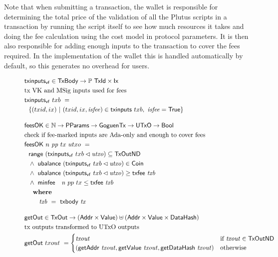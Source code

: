 Note that when submitting a transaction, the wallet is responsible for
determining the total price of the
validation of all the Plutus scripts in a transaction
by running the script itself to see how much resources it takes and doing the
fee calculation using the cost model in protocol parameters. It is then
also responsible for adding enough inputs to the transaction to cover the
fees required. In the implementation of the wallet this is handled
automatically by default, so this generates no overhead for users.

\begin{figure}[htb]
  \begin{align*}
    & \fun{txinputs_{vf}} \in \TxBody \to \powerset{\TxId \times \Ix} \\
    & \text{tx VK and MSig inputs used for fees} \\
    & \fun{txinputs_{vf}} ~txb~= \\
    &~~\{ (txid,ix)~\vert~(txid,ix,\var{isfee}) \in
    \fun{txinputs} ~txb,~
     \var{isfee} = \True\}
    \nextdef
    & \fun{feesOK} \in \N \to \PParams \to \GoguenTx \to \UTxO \to \Bool  \\
    & \text{check if fee-marked inputs are Ada-only and enough to cover fees} \\
    & \fun{feesOK} ~n~\var{pp}~tx~utxo~= \\
    &~~\fun{range}~(\fun{txinputs_{vf}}~{txb} \restrictdom \var{utxo}) \subseteq \TxOutND ~ \\
    &~~\wedge~ \fun{ubalance}~(\fun{txinputs_{vf}}~{txb} \restrictdom \var{utxo}) \in \Coin \\
    &~~      \wedge~ \fun{ubalance}~(\fun{txinputs_{vf}}~{txb} \restrictdom \var{utxo}) \geq \txfee{txb} ~ \\
    &~~      \wedge~ \minfee~n~{pp}~{tx} \leq \txfee{txb} \\
    &~~      \where \\
    & ~~~~~~~ \var{txb}~=~\txbody{tx}
    \nextdef
    & \fun{getOut} \in \TxOut \to (\Addr \times \Value) \uniondistinct (\Addr \times \Value \times \DataHash)  \\
    & \text{tx outputs transformed to UTxO outputs} \\
    & \fun{getOut} ~{txout}~= \begin{cases}
         \var{txout}  & \text{if~} \var{txout} \in \TxOutND \\
              (\fun{getAddr}~\var{txout}, \fun{getValue}~\var{txout},
              \fun{getDataHash}~\var{txout}) & \text{otherwise}

\end{cases}
\end{align*}
\end{figure}
